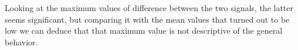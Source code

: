 Looking at the maximum values of difference between the two signals, the latter seems significant, but comparing it with the mean values that turned out to be low we can deduce that that maximum value is not descriptive of the general behavior.





